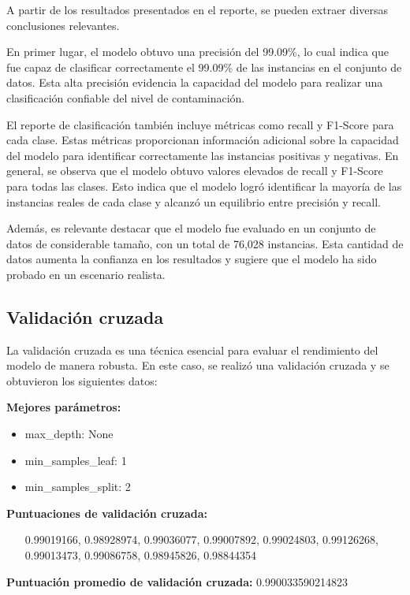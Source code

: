 A partir de los resultados presentados en el reporte, se pueden extraer diversas conclusiones relevantes.

En primer lugar, el modelo obtuvo una precisión del 99.09\%, lo cual indica que fue capaz de clasificar correctamente el 99.09\% de las instancias en el conjunto de datos. Esta alta precisión evidencia la capacidad del modelo para realizar una clasificación confiable del nivel de contaminación.\cite{xu2017long}

El reporte de clasificación también incluye métricas como recall y F1-Score para cada clase. Estas métricas proporcionan información adicional sobre la capacidad del modelo para identificar correctamente las instancias positivas y negativas. En general, se observa que el modelo obtuvo valores elevados de recall y F1-Score para todas las clases. Esto indica que el modelo logró identificar la mayoría de las instancias reales de cada clase y alcanzó un equilibrio entre precisión y recall.\cite{liang2018analysis}

Además, es relevante destacar que el modelo fue evaluado en un conjunto de datos de considerable tamaño, con un total de 76,028 instancias. Esta cantidad de datos aumenta la confianza en los resultados y sugiere que el modelo ha sido probado en un escenario realista.

\subsection{Validación cruzada}

La validación cruzada es una técnica esencial para evaluar el rendimiento del modelo de manera robusta. En este caso, se realizó una validación cruzada y se obtuvieron los siguientes datos:

\textbf{Mejores parámetros:}
\begin{itemize}
    \item max\_depth: None
    \item min\_samples\_leaf: 1
    \item min\_samples\_split: 2
\end{itemize}

\textbf{Puntuaciones de validación cruzada:}
\begin{itemize}
    \item [0.99019166, 0.98928974, 0.99036077, 0.99007892, 0.99024803, 0.99126268, 0.99013473, 0.99086758, 0.98945826, 0.98844354]
\end{itemize}

\textbf{Puntuación promedio de validación cruzada:} 0.990033590214823

